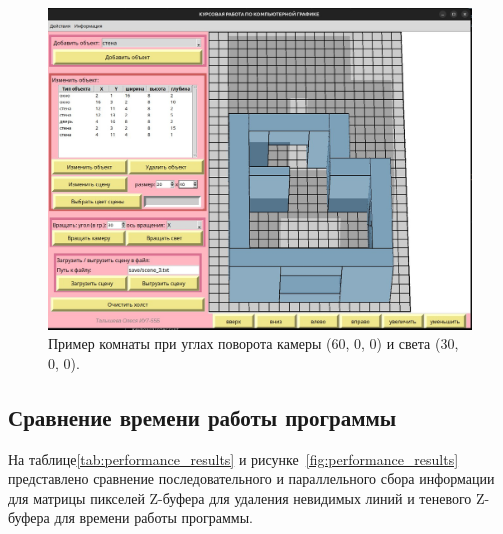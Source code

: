 \begin{figure}[H]
    \centering
    \includegraphics[width=1\textwidth]{img/example_light_60_0_0_camera_30_0_0.png}
    \caption{Пример комнаты при углах поворота камеры (60, 0, 0) и света (30, 0, 0).}
    \label{fig:example_flat_1_4}
\end{figure}


\subsection{Сравнение времени работы программы}

\hspace{1.25cm}
На таблице\ref{tab:performance_results} и рисунке~\ref{fig:performance_results} представлено сравнение последовательного и параллельного сбора информации для матрицы пикселей Z-буфера для удаления невидимых линий и теневого Z-буфера для времени работы программы.

